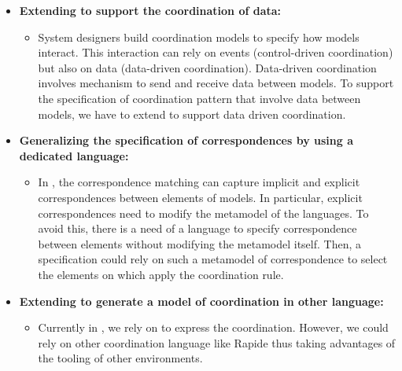 \begin{itemize}
	\item \textbf{Extending \bcool to support the coordination of data:} 
	\begin{itemize}
		\item System designers build coordination models to specify how models interact. This interaction can rely on events (\ie control-driven coordination) but also on data (\ie data-driven coordination). Data-driven coordination involves mechanism to send and receive data between models. To support the specification of coordination pattern that involve data between models, we have to extend \bcool to support data driven coordination.   
	\end{itemize}
	
	\item \textbf{Generalizing the specification of correspondences by using a dedicated language:}
		\begin{itemize}
			\item In \bcool, the correspondence matching can capture implicit and explicit correspondences between elements of models. In particular, explicit correspondences need to modify the metamodel of the languages. To avoid this, there is a need of a language to specify correspondence between elements without modifying the metamodel itself. Then, a \bcool specification could rely on such a metamodel of correspondence to select the elements on which apply the coordination rule. 
		\end{itemize}
			\item \textbf{Extending \bcool to generate a model of coordination in other language:} 
			\begin{itemize}
				\item Currently in \bcool, we rely on \ccsl to express the coordination. However, we could rely on other coordination language like Rapide thus taking advantages of the tooling of other environments.        
			\end{itemize}
\end{itemize}
